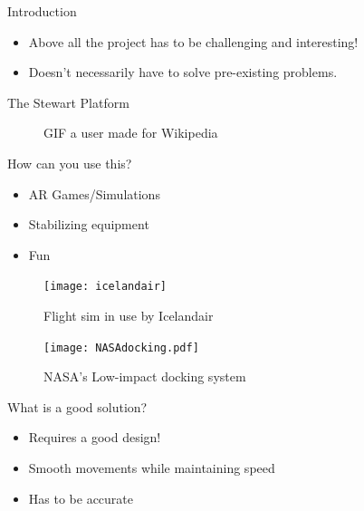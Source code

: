 \documentclass{rubeamer}
\begin{document}
\rutitleframe{}


\begin{frame}{Introduction}
	\begin{itemize}
		\item Above all the project has to be challenging and interesting!
		\item Doesn't necessarily have to solve pre-existing problems.
	\end{itemize}
\end{frame}

\begin{frame}{The Stewart Platform}
	\begin{figure}
		\centering
		\caption*{GIF a user made for Wikipedia~\cite{gif_hex}}
	\end{figure}
\end{frame}

\begin{frame}{How can you use this?}
	\vspace{1em}
	\begin{itemize}
		\item AR Games/Simulations
		\item Stabilizing equipment
		\item Fun
	\end{itemize}
	
	\begin{figure}
		\centering
		\texttt{[image: icelandair]}
		\caption*{Flight sim in use by Icelandair~\cite{icelandair}}
	\end{figure}
\end{frame}

\begin{frame}
	\begin{figure}
		\centering
		\texttt{[image: NASAdocking.pdf]}
		\caption*{NASA's Low-impact docking system \cite{pres:NASAdock}}
	\end{figure}
\end{frame}

\begin{frame}{What is a good solution?}
	\begin{itemize}
		\item Requires a good design!
		\item Smooth movements while maintaining speed
		\item Has to be accurate
	\end{itemize}
\end{frame}
\end{document}
